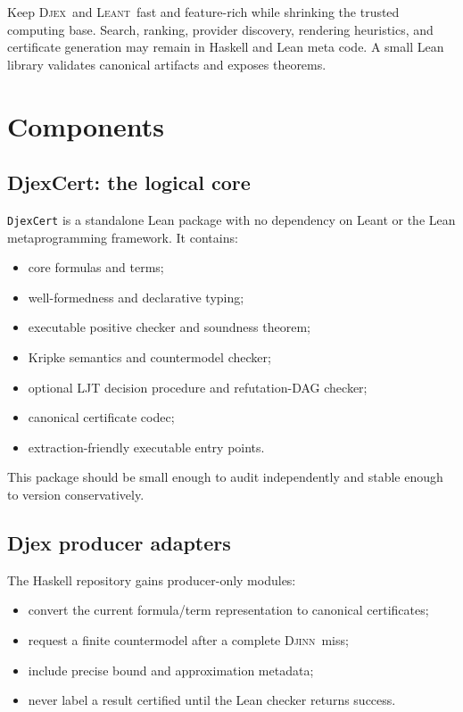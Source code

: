 \documentclass[11pt,letterpaper,openany]{report}
\theoremstyle{definition}
\theoremstyle{remark}
\newcommand{\Djex}{\textsc{Djex}}
\newcommand{\Djinn}{\textsc{Djinn}}
\newcommand{\Leant}{\textsc{Leant}}
\newcommand{\code}[1]{\texttt{#1}}
\begin{document}
Keep \Djex\ and \Leant\ fast and feature-rich while shrinking the trusted computing base. Search, ranking, provider discovery, rendering heuristics, and certificate generation may remain in Haskell and Lean meta code. A small Lean library validates canonical artifacts and exposes theorems.

\section{Components}

\subsection{DjexCert: the logical core}

\code{DjexCert} is a standalone Lean package with no dependency on Leant or the Lean metaprogramming framework. It contains:

\begin{itemize}
\item core formulas and terms;
\item well-formedness and declarative typing;
\item executable positive checker and soundness theorem;
\item Kripke semantics and countermodel checker;
\item optional LJT decision procedure and refutation-DAG checker;
\item canonical certificate codec;
\item extraction-friendly executable entry points.
\end{itemize}

This package should be small enough to audit independently and stable enough to version conservatively.

\subsection{Djex producer adapters}

The Haskell repository gains producer-only modules:

\begin{itemize}
\item convert the current formula/term representation to canonical certificates;
\item request a finite countermodel after a complete \Djinn\ miss;
\item include precise bound and approximation metadata;
\item never label a result certified until the Lean checker returns success.
\end{itemize}
\end{document}
